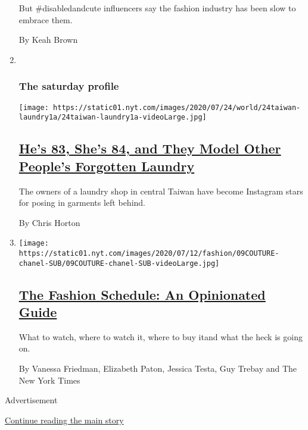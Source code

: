 \begin{enumerate}
  But \#disabledandcute influencers say the fashion industry has been
  slow to embrace them.

  By Keah Brown
\item ~
  \hypertarget{the-saturday-profile}{%
  \subsubsection{The saturday profile}\label{the-saturday-profile}}

  \texttt{[image: https://static01.nyt.com/images/2020/07/24/world/24taiwan-laundry1a/24taiwan-laundry1a-videoLarge.jpg]}

  \hypertarget{hes-83-shes-84-and-they-model-other-peoples-forgotten-laundry}{%
  \subsection{\texorpdfstring{\href{/2020/07/24/world/asia/taiwan-octogenarian-couple-instagram-laundry.html}{He's
  83, She's 84, and They Model Other People's Forgotten
  Laundry}}{He's 83, She's 84, and They Model Other People's Forgotten Laundry}}\label{hes-83-shes-84-and-they-model-other-peoples-forgotten-laundry}}

  The owners of a laundry shop in central Taiwan have become Instagram
  stars for posing in garments left behind.

  By Chris Horton
\item
  \texttt{[image: https://static01.nyt.com/images/2020/07/12/fashion/09COUTURE-chanel-SUB/09COUTURE-chanel-SUB-videoLarge.jpg]}

  \hypertarget{the-fashion-schedule-an-opinionated-guide}{%
  \subsection{\texorpdfstring{\href{/article/fashion-week-trends-2020.html}{The
  Fashion Schedule: An Opinionated
  Guide}}{The Fashion Schedule: An Opinionated Guide}}\label{the-fashion-schedule-an-opinionated-guide}}

  What to watch, where to watch it, where to buy itand what the heck is
  going on.

  By Vanessa Friedman, Elizabeth Paton, Jessica Testa, Guy Trebay and
  The New York Times
\end{enumerate}

Advertisement

\protect\hyperlink{after-mid1}{Continue reading the main story}

